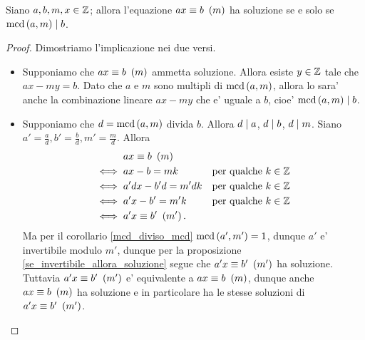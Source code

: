 \begin{proposition} \label{cong_ha_soluzione_sse_mcd_div_b}
    Siano $a, b, m, x \in \mathbb{Z}$; allora l'equazione $ax \equiv b \ \left(m\right)$ ha soluzione se e solo se $\operatorname{mcd}\left(a, m\right) \mid b$.
\end{proposition}
\begin{proof}
    Dimostriamo l'implicazione nei due versi.
    \begin{itemize}
        \item Supponiamo che $ax \equiv b \ \left(m\right)$ ammetta soluzione. Allora esiste $y \in \mathbb{Z}$ tale che $ax - my = b$. Dato che $a$ e $m$ sono multipli di $\operatorname{mcd}\left(a, m\right)$, allora lo sara' anche la combinazione lineare $ax - my$ che e' uguale a $b$, cioe' $\operatorname{mcd}\left(a, m\right) \mid b$.
        \item Supponiamo che $d = \operatorname{mcd}\left(a, m\right)$ divida $b$. Allora $d\mid a$, $d \mid b$, $d \mid m$. Siano $a' = \frac{a}{d}, b' = \frac{b}{d}, m' = \frac{m}{d}$. Allora 
        \begin{align*}
            &ax \equiv b \ \left(m\right)\\
            \iff{} &ax - b = mk   &\text{per qualche $k \in \mathbb{Z}$} \\
            \iff{} &a'dx - b'd = m'dk &\text{per qualche $k \in \mathbb{Z}$} \\
            \iff{} &a'x - b' = m'k &\text{per qualche $k \in \mathbb{Z}$} \\
            \iff{} &a'x \equiv b'\ \left(m'\right).
        \end{align*}
        Ma per il corollario \ref{mcd_diviso_mcd} $\operatorname{mcd}\left(a', m'\right) = 1$, dunque $a'$ e' invertibile modulo $m'$, dunque per la proposizione \ref{se_invertibile_allora_soluzione} segue che $a'x \equiv b' \ \left(m'\right)$ ha soluzione. Tuttavia $a'x \equiv b' \ \left(m'\right)$ e' equivalente a $ax \equiv b \ \left(m\right)$, dunque anche $ax \equiv b \ \left(m\right)$ ha soluzione e in particolare ha le stesse soluzioni di $a'x \equiv b' \ \left(m'\right)$.
    \end{itemize}
\end{proof}

